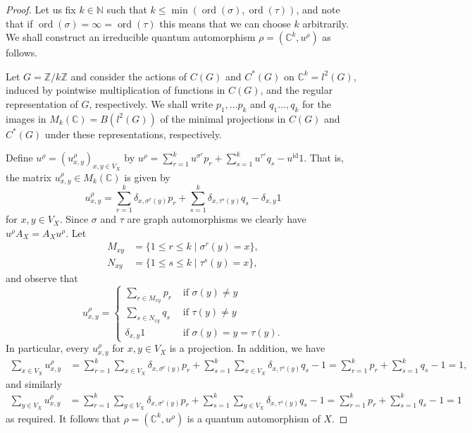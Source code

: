 \documentclass[10pt,a4paper]{amsart}
\DeclareMathOperator{\id}{id}
\DeclareMathOperator{\ord}{ord}
\begin{document}
\begin{proof} 
Let us fix $ k \in \mathbb{N} $ such that $ k \leq \min(\ord(\sigma), \ord(\tau)) $, and note that if $ \ord(\sigma) = \infty = \ord(\tau) $ this means that we can 
choose $ k $ arbitrarily. We shall construct an irreducible quantum automorphism $ \rho = (\mathbb{C}^k, u^\rho) $ as follows. 

Let $ G = \mathbb{Z}/k\mathbb{Z} $ and consider the actions of $ C(G) $ and $ C^*(G) $ on $ \mathbb{C}^k = l^2(G) $, induced by pointwise multiplication of functions in $ C(G) $, 
and the regular representation of $ G $, respectively. We shall write $ p_1, \dots p_k $ and $ q_1 \dots, q_k $ for the images in $ M_k(\mathbb{C}) = B(l^2(G)) $ of the minimal 
projections in $ C(G) $ and $ C^*(G) $ under these representations, respectively. 
 
Define $ u^\rho = (u^\rho_{x,y})_{x,y \in V_X} $ by $ u^\rho = \sum_{r = 1}^k u^{\sigma^r} p_r + \sum_{s = 1}^k u^{\tau^s} q_s - u^{\id} 1 $. That 
is, the matrix $ u^\rho_{x,y} \in M_k(\mathbb{C}) $ is given by 
$$ 
u^\rho_{x,y} = \sum_{r = 1}^k \delta_{x,\sigma^r(y)} p_r + \sum_{s = 1}^k \delta_{x,\tau^s(y)} q_s - \delta_{x,y} 1
$$ 
for $ x, y \in V_X $. 
Since $ \sigma $ and $ \tau $ are graph automorphisms we clearly have $ u^\rho A_X = A_X u^\rho $. Let 
\begin{align*}
M_{xy} &= \{1 \leq r \leq k \mid \sigma^r(y) = x \}, \\
N_{xy} &= \{1 \leq s \leq k \mid \tau^s(y) = x \}, 
\end{align*}
and observe that 
$$ 
u^\rho_{x,y} = 
\begin{cases} 
\sum_{r \in M_{xy}} p_r & \text{ if } \sigma(y) \neq y  \\
\sum_{s \in N_{xy}} q_s & \text{ if } \tau(y) \neq y  \\
\delta_{x,y} 1 & \text{ if } \sigma(y) = y = \tau(y). 
\end{cases}
$$
In particular, every $ u^\rho_{x,y} $ for $ x, y \in V_X $ is a projection. In addition, we have 
\begin{align*}
\sum_{x \in V_X} u^\rho_{x,y} &= \sum_{r = 1}^k \sum_{x \in V_X} \delta_{x, \sigma^r(y)} p_r + \sum_{s = 1}^k \sum_{x \in V_X} \delta_{x, \tau^s(y)} q_s - 1
= \sum_{r = 1}^k  p_r + \sum_{s = 1}^k q_s - 1 = 1,  
\end{align*}
and similarly 
\begin{align*}
\sum_{y \in V_X} u^\rho_{x,y} &= \sum_{r = 1}^k \sum_{y \in V_X} \delta_{x,\sigma^r(y)} p_r + \sum_{s = 1}^k \sum_{y \in V_X} \delta_{x,\tau^s(y)} q_s - 1 
= \sum_{r = 1}^k p_r + \sum_{s = 1}^k q_s - 1 = 1 
\end{align*}
as required. It follows that $ \rho = (\mathbb{C}^k, u^\rho) $ is a quantum automorphism of $ X $. 


\end{proof}
\end{document}
